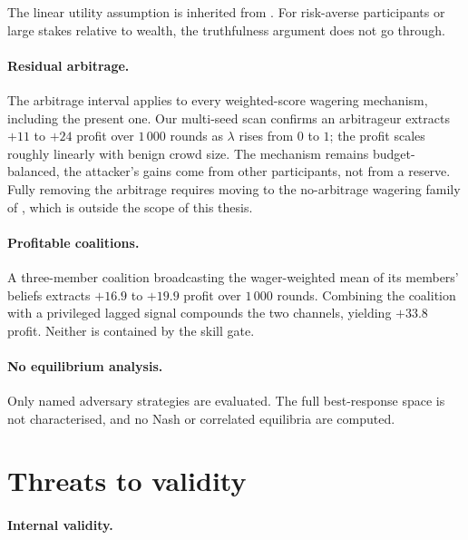 \documentclass[
  11pt,
  a4paper,
  oneside]{report}
\begin{document}
The linear utility assumption is inherited from
\citet{lambert2008selffinanced}. For risk-averse participants or large
stakes relative to wealth, the truthfulness argument does not go
through.

\paragraph{Residual arbitrage.}

The \citet{chen2014arbitrage} arbitrage interval applies to every
weighted-score wagering mechanism, including the present one. Our
multi-seed scan confirms an arbitrageur extracts \(+11\) to \(+24\)
profit over \(1\,000\) rounds as \(\lambda\) rises from \(0\) to \(1\);
the profit scales roughly linearly with benign crowd size. The mechanism
remains budget-balanced, the attacker's gains come from other
participants, not from a reserve. Fully removing the arbitrage requires
moving to the no-arbitrage wagering family of \citet{chen2014arbitrage},
which is outside the scope of this thesis.

\paragraph{Profitable coalitions.}

A three-member coalition broadcasting the wager-weighted mean of its
members' beliefs extracts \(+16.9\) to \(+19.9\) profit over \(1\,000\)
rounds. Combining the coalition with a privileged lagged signal
compounds the two channels, yielding \(+33.8\) profit. Neither is
contained by the skill gate.

\paragraph{No equilibrium analysis.}

Only named adversary strategies are evaluated. The full best-response
space is not characterised, and no Nash or correlated equilibria are
computed.

\section{Threats to validity}\label{threats-to-validity}

\paragraph{Internal validity.}
\end{document}

